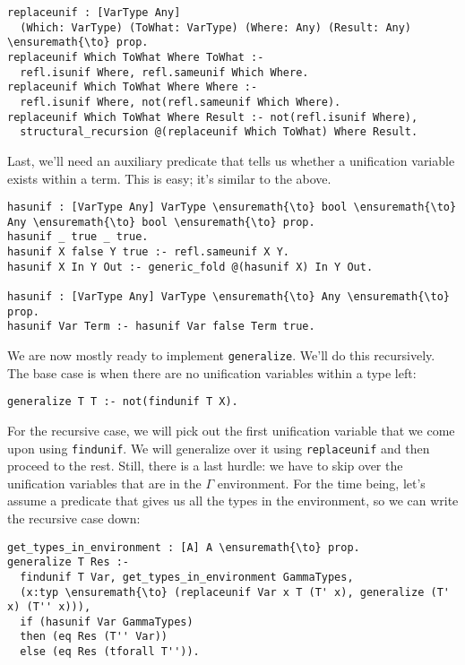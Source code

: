 \begin{verbatim}
replaceunif : [VarType Any]
  (Which: VarType) (ToWhat: VarType) (Where: Any) (Result: Any) \ensuremath{\to} prop.
replaceunif Which ToWhat Where ToWhat :-
  refl.isunif Where, refl.sameunif Which Where.
replaceunif Which ToWhat Where Where :-
  refl.isunif Where, not(refl.sameunif Which Where).
replaceunif Which ToWhat Where Result :- not(refl.isunif Where),
  structural_recursion @(replaceunif Which ToWhat) Where Result.
\end{verbatim}

Last, we'll need an auxiliary predicate that tells us whether a
unification variable exists within a term. This is easy; it's similar to
the above.

\begin{verbatim}
hasunif : [VarType Any] VarType \ensuremath{\to} bool \ensuremath{\to} Any \ensuremath{\to} bool \ensuremath{\to} prop.
hasunif _ true _ true.
hasunif X false Y true :- refl.sameunif X Y.
hasunif X In Y Out :- generic_fold @(hasunif X) In Y Out.

hasunif : [VarType Any] VarType \ensuremath{\to} Any \ensuremath{\to} prop.
hasunif Var Term :- hasunif Var false Term true.
\end{verbatim}

We are now mostly ready to implement \texttt{generalize}. We'll do this
recursively. The base case is when there are no unification variables
within a type left:

\begin{verbatim}
generalize T T :- not(findunif T X).
\end{verbatim}

For the recursive case, we will pick out the first unification variable
that we come upon using \texttt{findunif}. We will generalize over it
using \texttt{replaceunif} and then proceed to the rest. Still, there is
a last hurdle: we have to skip over the unification variables that are
in the \(\Gamma\) environment. For the time being, let's assume a
predicate that gives us all the types in the environment, so we can
write the recursive case down:

\begin{verbatim}
get_types_in_environment : [A] A \ensuremath{\to} prop.
generalize T Res :-
  findunif T Var, get_types_in_environment GammaTypes,
  (x:typ \ensuremath{\to} (replaceunif Var x T (T' x), generalize (T' x) (T'' x))),
  if (hasunif Var GammaTypes)
  then (eq Res (T'' Var))
  else (eq Res (tforall T'')).
\end{verbatim}

